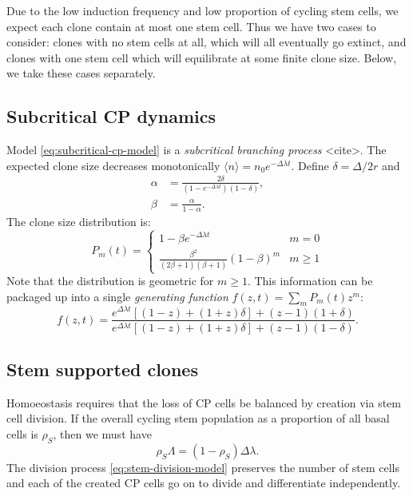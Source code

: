 \documentclass[10pt,UKenglish]{article}
\begin{document}
Due to the low induction frequency and low proportion of cycling stem cells, we expect each clone contain at most one stem cell. Thus we have two cases to consider: clones with no stem cells at all, which will all eventually go extinct, and clones with one stem cell which will equilibrate at some finite clone size. Below, we take these cases separately.

\subsection{Subcritical CP dynamics}

Model \ref{eq:subcritical-cp-model} is a \emph{subcritical branching process} <cite>. The expected clone size decreases monotonically $\langle n \rangle = n_0 e^{-\Delta \lambda t}.$ Define $\delta = \Delta/2r$ and 
\begin{align*}
\alpha &= \frac{2\delta}{\left(1 - e^{-\Delta \lambda t}\right)\left(1-\delta\right)}, \\
\beta &= \frac{\alpha}{1-\alpha}.
\end{align*}
The clone size distribution is:
\begin{equation*}
P_m(t) = \begin{cases}
1 - \beta e^{-\Delta \lambda t} & m=0 \\
\frac{\beta^2}{(2\beta +1)(\beta +1)}\left(1-\beta\right)^m & m\ge1
\end{cases}
\end{equation*}
Note that the distribution is geometric for $m \ge 1$. This information can be packaged up into a single \emph{generating function} $f(z,t) = \sum_m P_m(t) z^m$:
\begin{equation*}
f(z,t) = \frac{e^{\Delta \lambda t}\left[(1-z) + (1+z)\delta\right] + (z-1)(1+\delta)}{e^{\Delta \lambda t}\left[(1-z) + (1+z)\delta\right] + (z-1)(1-\delta)}.
\end{equation*}

\subsection{\label{sec:subcritical-immigration}Stem supported clones}

Homoeostasis requires that the loss of CP cells be balanced by creation via stem cell division. If the overall cycling stem population as a proportion of all basal cells is $\rho_S$, then we must have $$\rho_S \Lambda = (1-\rho_S) \Delta \lambda.$$ The division process \ref{eq:stem-division-model} preserves the number of stem cells and each of the created CP cells go on to divide and differentiate independently.
\end{document}
